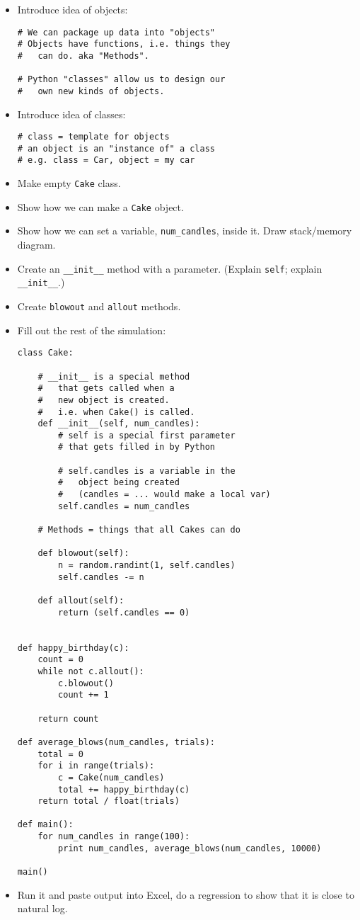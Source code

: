 \documentclass{article}
\begin{document}
\begin{itemize}
\item Introduce idea of objects:
\begin{verbatim}
# We can package up data into "objects"
# Objects have functions, i.e. things they
#   can do. aka "Methods".

# Python "classes" allow us to design our
#   own new kinds of objects.
\end{verbatim}
\item Introduce idea of classes:
\begin{verbatim}
# class = template for objects
# an object is an "instance of" a class
# e.g. class = Car, object = my car
\end{verbatim}
\item Make empty \verb|Cake| class.
\item Show how we can make a \verb|Cake| object.
\item Show how we can set a variable, \verb|num_candles|, inside it.
  Draw stack/memory diagram.
\item Create an \verb|__init__| method with a parameter. (Explain
  \verb|self|; explain \verb|__init__|.)
\item Create \verb|blowout| and \verb|allout| methods.
\item Fill out the rest of the simulation:
\begin{verbatim}
class Cake:

    # __init__ is a special method
    #   that gets called when a
    #   new object is created.
    #   i.e. when Cake() is called.
    def __init__(self, num_candles):
        # self is a special first parameter
        # that gets filled in by Python

        # self.candles is a variable in the
        #   object being created
        #   (candles = ... would make a local var)
        self.candles = num_candles

    # Methods = things that all Cakes can do

    def blowout(self):
        n = random.randint(1, self.candles)
        self.candles -= n

    def allout(self):
        return (self.candles == 0)


def happy_birthday(c):
    count = 0
    while not c.allout():
        c.blowout()
        count += 1

    return count

def average_blows(num_candles, trials):
    total = 0
    for i in range(trials):
        c = Cake(num_candles)
        total += happy_birthday(c)
    return total / float(trials)

def main():
    for num_candles in range(100):
        print num_candles, average_blows(num_candles, 10000)

main()
\end{verbatim}
\item Run it and paste output into Excel, do a regression to show that
  it is close to natural log.
\end{itemize}
\end{document}
